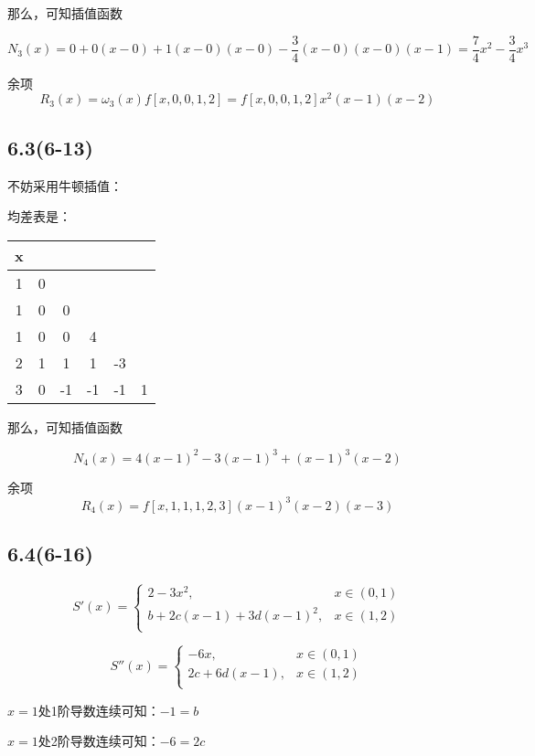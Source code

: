 \documentclass[UTF8,zihao=5]{ctexart}
\begin{document}
那么，可知插值函数

$$
    N_3(x)=0 + 0(x-0) + 1(x-0)(x-0) - \frac{3}{4}(x-0)(x-0)(x-1)
    =\frac{7}{4}x^2-\frac{3}{4}x^3
$$

余项
$$
    R_3(x)=\omega_3(x)f[x,0,0,1,2]
    =f[x,0,0,1,2]x^2(x-1)(x-2)
$$


\subsection*{6.3(6-13)}
不妨采用牛顿插值：

均差表是：
\begin{table}[H]
    \centering
    \begin{tabular}{c|ccccc}
        x                        \\
        \hline
        1 & 0 &    &    &    &   \\
        1 & 0 & 0  &    &    &   \\
        1 & 0 & 0  & 4  &    &   \\
        2 & 1 & 1  & 1  & -3 &   \\
        3 & 0 & -1 & -1 & -1 & 1 \\
    \end{tabular}
\end{table}

那么，可知插值函数

$$
    N_4(x)=4(x-1)^2-3(x-1)^3+(x-1)^3(x-2)
$$

余项
$$
    R_4(x)=f[x,1,1,1,2,3](x-1)^3(x-2)(x-3)
$$


\subsection*{6.4(6-16)}

$$
    S'(x)=\left\{
    \begin{array}{lr}
        2-3x^2,              & x\in(0,1) \\
        b+2c(x-1)+3d(x-1)^2, & x\in(1,2) \\
    \end{array}
    \right.
$$

$$
    S''(x)=\left\{
    \begin{array}{lr}
        -6x,        & x\in(0,1) \\
        2c+6d(x-1), & x\in(1,2) \\
    \end{array}
    \right.
$$

$x=1$处1阶导数连续可知：$-1=b$

$x=1$处2阶导数连续可知：$-6=2c$
\end{document}
